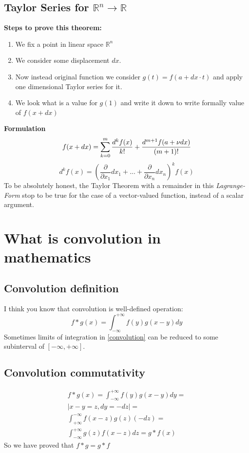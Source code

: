\documentclass[12pt,a4paper]{article}
\theoremstyle{plain}
\begin{document}
\subsection{Taylor Series for $\mathbb{R}^n \to \mathbb{R}$}
\textbf{Steps to prove this theorem:}
\begin{enumerate}
\item We fix a point \textbf{} in linear space $\mathbb{R}^n$ 
\item We consider some displacement $dx$.
\item Now instead original function we consider $g(t)=f(a+dx \cdot t)$ and apply one dimensional Taylor series for it.
\item We look what is a value for $g(1)$ and write it down to write formally value of $f(x+dx)$ 
\end{enumerate}
\textbf{Formulation}
\begin{equation}
 f(x+dx)=\sum_{k=0}^{m}\dfrac{d^kf(x)}{k!}+\dfrac{d^{m+1}f(a+\nu dx)}{(m+1)!}\\
\end{equation}
\begin{equation}
 d^kf(x)=\left(\frac{\partial}{\partial x_1}dx_1+...+\frac{\partial}{\partial x_n}dx_n\right)^kf(x)
\end{equation}
To be absolutely honest, the Taylor Theorem with a remainder in this \textit{Lagrange-Form} stop to be true for the case of a vector-valued function, instead of a scalar argument.

\section{What is convolution in mathematics}
\subsection{Convolution definition}
I think you know that convolution is well-defined operation:
\begin{equation}\label{convolution}
f*g(x)=\int^{+\infty}_{-\infty} f(y)g(x-y)dy
\end{equation}
Sometimes limits of integration in \eqref{convolution} can be reduced to some subinterval of $[-\infty, +\infty]$.
\subsection{Convolution commutativity}
\begin{multline}\label{convolution_commutativity}
f*g(x)=\int^{+\infty}_{-\infty} f(y)g(x-y)dy=\\
|x-y=z,dy=-dz|=\\
\int^{-\infty}_{+\infty}  f(x-z)g(z)(-dz)=\\
\int^{+\infty}_{-\infty}  g(z)f(x-z)dz=g*f(x)
\end{multline}
So we have proved that $f*g=g*f$
\end{document}
